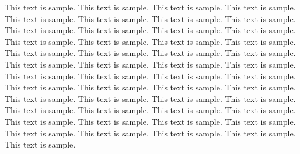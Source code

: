 This text is sample. This text is sample. This text is sample. This text is sample. This text is sample. This text is sample. This text is sample. This text is sample. This text is sample. This text is sample. This text is sample. This text is sample. This text is sample. This text is sample. This text is sample. This text is sample. This text is sample. This text is sample. This text is sample. This text is sample. This text is sample. This text is sample. This text is sample. This text is sample. This text is sample. This text is sample. This text is sample. This text is sample. This text is sample. This text is sample. This text is sample. This text is sample. This text is sample. This text is sample. This text is sample. This text is sample. This text is sample. This text is sample. This text is sample. This text is sample. This text is sample. This text is sample. This text is sample. This text is sample. This text is sample. This text is sample. This text is sample. This text is sample. This text is sample. 

